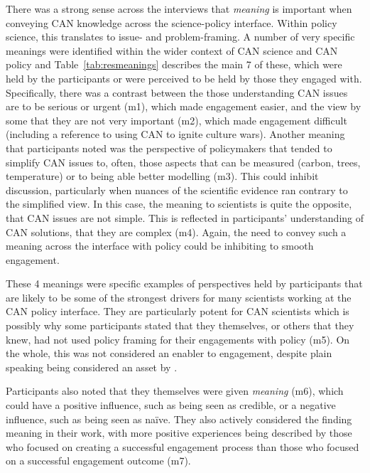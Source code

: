 There was a strong sense across the interviews that \emph{meaning} is important when conveying CAN knowledge across the science-policy interface. Within policy science, this translates to issue- and problem-framing. A number of very specific meanings were identified within the wider context of CAN science and CAN policy and Table~\ref{tab:resmeanings} describes the main 7 of these, which were held by the participants or were perceived to be held by those they engaged with. Specifically, there was a contrast between the those understanding CAN issues are to be serious or urgent (m1), which made engagement easier, and the view by some that they are not very important (m2), which made engagement difficult (including a reference to using CAN to ignite culture wars). Another meaning that participants noted was the perspective of policymakers that tended to simplify CAN issues to, often, those aspects that can be measured (carbon, trees, temperature) or to being able better modelling (m3). This could inhibit discussion, particularly when nuances of the scientific evidence ran contrary to the simplified view. In this case, the meaning to scientists is quite the opposite, that CAN issues are not simple. This is reflected in participants' understanding of CAN solutions, that they are complex (m4). Again, the need to convey such a meaning across the interface with policy could be inhibiting to smooth engagement. 

These 4 meanings were specific examples of perspectives held by participants that are likely to be some of the strongest drivers for many scientists working at the CAN policy interface. They are particularly potent for CAN scientists which is possibly why some participants stated that they themselves, or others that they knew, had not used policy framing for their engagements with policy (m5). On the whole, this was not considered an enabler to engagement, despite plain speaking being considered an asset by . 

Participants also noted that they themselves were given \emph{meaning} (m6), which could have a positive influence, such as being seen as credible, or a negative influence, such as being seen as na\"ive. They also actively considered the finding meaning in their work, with more positive experiences being described by those who focused on creating a successful engagement process than those who focused on a successful engagement outcome (m7).

